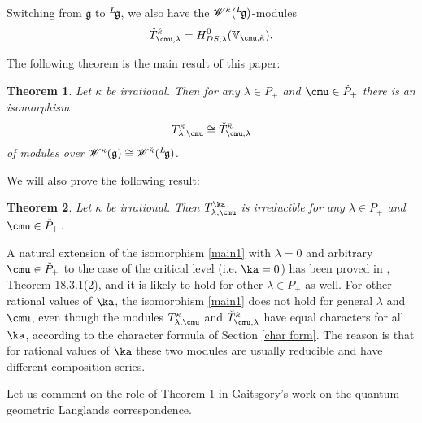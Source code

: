 \documentclass{amsart}
\newcommand{\+}{\mathop{\oplus}}
\renewcommand{\*}{{\otimes}}
\newcommand{\mf}{\mathfrak}
\newcommand{\g}{\mf{g}}
\newcommand{\W}{\mathscr{W}}
\newcommand{\lam}{\lambda}
\def\neg{\negthinspace}
\def\lg{{}^L\neg\g}
\theoremstyle{theorem}
\newtheorem{Th}{Theorem}[section]
\theoremstyle{remark}
\numberwithin{equation}{section}
\begin{document}

Switching from $\g$ to $\lg$, we also have the
$\W^{\check{\kappa}}(\lg)$-modules
$$
\check{T}_{\cmu,\lam}^{\check\kappa} =
H^0_{DS,\lam}(\mathbb{V}_{\cmu,\check\kappa}).
$$

The following theorem is the main result of this paper:

\begin{Th}\label{Th:symmetry}
Let $\kappa$ be irrational. Then for any $\lam \in P_+$ and $\cmu
\in \check{P}_+$ there is an isomorphism
\begin{equation}    \label{main1}
T_{\lam,\cmu}^{\kappa}\cong \check{T}_{\cmu,\lam}^{\check{\kappa}}
\end{equation}
of modules over $\W^\kappa(\g) \cong \W^{\check{\kappa}}(\lg)$.
\end{Th}

We will also prove the following result:

\begin{Th}    \label{Th:irr}
Let $\kappa$ be irrational. Then $T^\ka_{\lam,\cmu}$ is irreducible
for any $\lam \in P_+$ and $\cmu \in \check{P}_+$.
\end{Th}

A natural extension of the isomorphism \eqref{main1} with $\lam=0$ and
arbitrary $\cmu \in \check{P}_+$ to the case of the critical level
(i.e. $\ka=0$) has been proved in \cite{FG06}, Theorem 18.3.1(2), and
it is likely to hold for other $\lam \in P_+$ as well. For other
rational values of $\ka$, the isomorphism \eqref{main1} does not hold
for general $\lam$ and $\cmu$, even though the modules
$T_{\lam,\cmu}^{\kappa}$ and $\check{T}_{\cmu,\lam}^{\check{\kappa}}$
have equal characters for all $\ka$, according to the character
formula of Section \ref{char form}. The reason is that for rational
values of $\ka$ these two modules are usually reducible and have
different composition series.


\medskip

Let us comment on the role of Theorem \ref{Th:symmetry} in Gaitsgory's
work on the quantum geometric Langlands correspondence.
\end{document}
